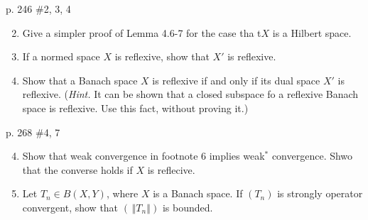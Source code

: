 \documentclass[10pt,a4paper]{report}
\newcommand{\NORM}[1]{\,\left \Vert #1 \right \Vert}
\begin{document}
\newpage p. 246 \#2, 3, 4 
\begin{enumerate}
	\setcounter{enumi}{1}
	\item Give a simpler proof of Lemma 4.6-7 for the case tha t$X$ is a Hilbert space.
	\item If a normed space $X$ is reflexive, show that $X'$ is reflexive.
	\item Show that a Banach space $X$ is reflexive if and only if its dual space $X'$ is reflexive.  (\textit{Hint.}  It can be shown that a closed subspace fo a reflexive Banach space is reflexive.  Use this fact, without proving it.)
\end{enumerate}

\newpage p. 268 \#4, 7
\begin{enumerate}
	\setcounter{enumi}{3}
	\item Show that weak convergence in footnote 6 implies weak$^*$ convergence.  Shwo that the converse holds if $X$ is reflecive.
	\setcounter{enumi}{6}
	\item Let $T_n \in B(X,Y)$, where $X$ is a Banach space.  If $(T_n)$ is strongly operator convergent, show that $(\NORM{T_n})$ is bounded.

\end{enumerate}
\end{document}
